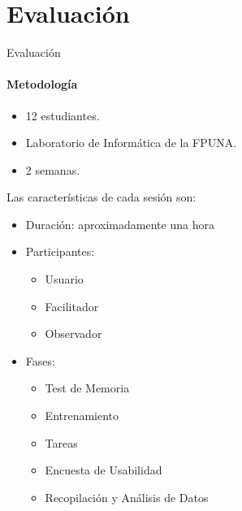 \section{Evaluaci\'on}

\begin{frame}{Evaluaci\'on}
\framesubtitle{Metodolog\'ia}

\begin{itemize}
    \item 12 estudiantes.
    \item Laboratorio de Inform\'atica de la FPUNA.
    \item 2 semanas.
\end{itemize}

Las características de cada sesión son:
\begin{itemize}
    \item Duración: aproximadamente una hora
    \item Participantes:
        \begin{itemize}
            \item Usuario
            \item Facilitador
            \item Observador
        \end{itemize}
    \item Fases:
        \begin{itemize}
            \item Test de Memoria
            \item Entrenamiento
            \item Tareas
            \item Encuesta de Usabilidad
            \item Recopilación y Análisis de Datos
        \end{itemize}   
\end{itemize}
\end{frame}


